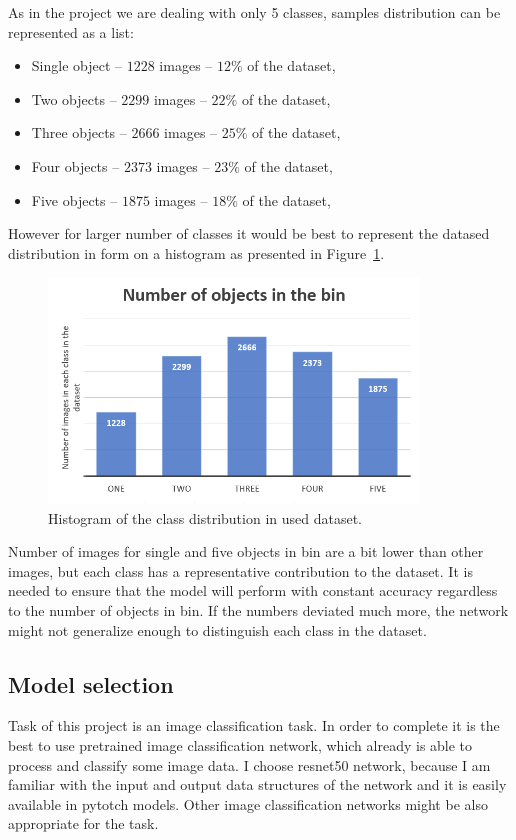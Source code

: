 \documentclass{article}
\begin{document}
As in the project we are dealing with only 5 classes, samples distribution can be represented as a list: 
\begin{itemize}
	\item Single object -- $1228$ images -- $12\%$ of the dataset,
	\item Two objects -- $2299$ images -- $22\%$ of the dataset,  
	\item Three objects -- $2666$ images -- $25\%$ of the dataset,  
	\item Four objects -- $2373$ images -- $23\%$ of the dataset,
	\item Five objects -- $1875$ images -- $18\%$ of the dataset,  
\end{itemize}
However for larger number of classes it would be best to represent the datased distribution in form on a histogram as presented in Figure~\ref{fig:histogram}.
\begin{figure}[ht]
	\centering
	\includegraphics[height=60mm]{data_histogram.png}
	\caption{Histogram of the class distribution in used dataset.}
	\label{fig:histogram}
\end{figure}

Number of images for single and five objects in bin are a bit lower than other images, but each class has a representative contribution to the dataset. It is needed to ensure that the model will perform with constant accuracy regardless to the number of objects in bin. If the numbers deviated much more, the network might not generalize enough to distinguish each class in the dataset.

\FloatBarrier

\subsection{Model selection}
Task of this project is an image classification task. In order to complete it is the best to use pretrained image classification network, which already is able to process and classify some image data. I choose resnet50 network, because I am familiar with the input and output data structures of the network and it is easily available in pytotch models. Other image classification networks might be also appropriate for the task. 
\end{document}
